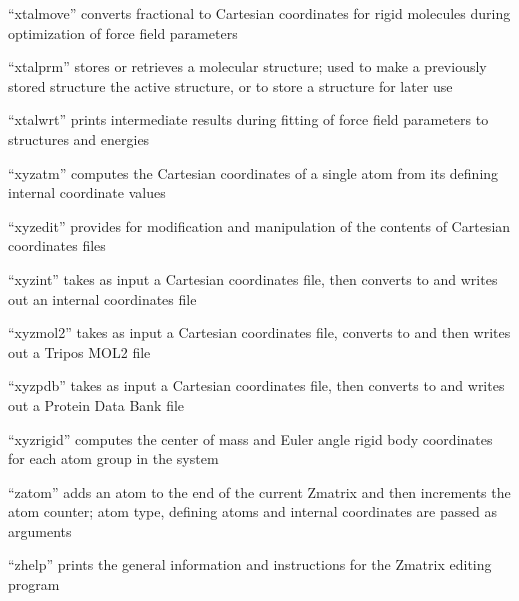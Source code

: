 \documentclass[letterpaper,11pt,english]{sphinxmanual}
\begin{document}

“xtalmove” converts fractional to Cartesian coordinates for
rigid molecules during optimization of force field parameters


“xtalprm” stores or retrieves a molecular structure; used to
make a previously stored structure the active structure, or to
store a structure for later use


“xtalwrt” prints intermediate results during fitting of
force field parameters to structures and energies


“xyzatm” computes the Cartesian coordinates of a single
atom from its defining internal coordinate values


“xyzedit” provides for modification and manipulation
of the contents of Cartesian coordinates files


“xyzint” takes as input a Cartesian coordinates file, then
converts to and writes out an internal coordinates file


“xyzmol2” takes as input a Cartesian coordinates file,
converts to and then writes out a Tripos MOL2 file


“xyzpdb” takes as input a Cartesian coordinates file,
then converts to and writes out a Protein Data Bank file


“xyzrigid” computes the center of mass and Euler angle rigid
body coordinates for each atom group in the system


“zatom” adds an atom to the end of the current Z\sphinxhyphen{}matrix
and then increments the atom counter; atom type, defining
atoms and internal coordinates are passed as arguments


“zhelp” prints the general information and instructions
for the Z\sphinxhyphen{}matrix editing program
\end{document}
